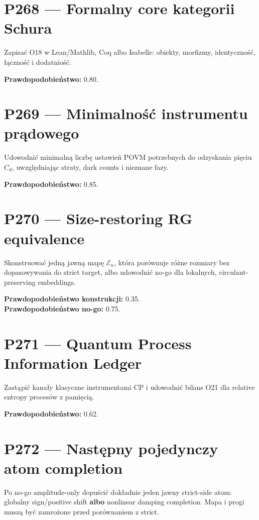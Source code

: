 \documentclass[11pt,a4paper,openany]{report}
\begin{document}
\section{P268 --- Formalny core kategorii Schura}

Zapisać O18 w Lean/\allowbreak{}Mathlib, Coq albo Isabelle: obiekty, morfizmy, identyczność, łączność i dodatniość.

\textbf{Prawdopodobieństwo:} 0.80.

\section{P269 --- Minimalność instrumentu prądowego}

Udowodnić minimalną liczbę ustawień POVM potrzebnych do odzyskania pięciu \(C_d\), uwzględniając straty, dark counts i nieznane fazy.

\textbf{Prawdopodobieństwo:} 0.85.

\section{P270 --- Size-restoring RG equivalence}

Skonstruować jedną jawną mapę \(\mathcal E_n\), która porównuje ró\.zne rozmiary bez dopasowywania do strict target, albo udowodnić no-go dla lokalnych, circulant-preserving embeddings.

\textbf{Prawdopodobieństwo konstrukcji:} 0.35.\\
\textbf{Prawdopodobieństwo no-go:} 0.75.

\section{P271 --- Quantum Process Information Ledger}

Zastąpić kanały klasyczne instrumentami CP i udowodnić bilans O21 dla relative entropy procesów z pamięcią.

\textbf{Prawdopodobieństwo:} 0.62.

\section{P272 --- Następny pojedynczy atom completion}

Po no-go amplitude-only dopuścić dokładnie jeden jawny strict-side atom: globalny sign/\allowbreak{}positive shift \textbf{albo} nonlinear damping completion. Mapa i progi muszą być zamro\.zone przed porównaniem z strict.
\end{document}
